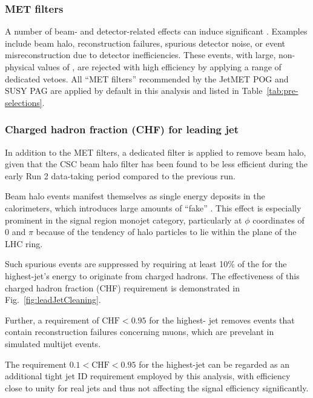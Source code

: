 \subsubsection{MET filters}

A number of beam- and detector-related effects can induce significant
\met. Examples include beam halo, reconstruction failures, spurious
detector noise, or event misreconstruction due to detector
inefficiencies. These events, with large, non-physical values of \met,
are rejected with high efficiency by applying a range of dedicated
vetoes. All ``MET filters'' recommended by the JetMET POG and SUSY PAG
are applied by default in this analysis and listed in
Table~\ref{tab:pre-selections}.

\subsubsection{Charged hadron fraction (CHF) for leading jet}

In addition to the MET filters, a dedicated filter is applied to
remove beam halo, given that the CSC beam halo filter has been found
to be less efficient during the early Run 2 data-taking period
compared to the previous run.

Beam halo events manifest themselves as single energy deposits in the
calorimeters, which introduces large amounts of ``fake'' \met. This
effect is especially prominent in the signal region monojet category,
particularly at $\phi$ coordinates of 0 and $\pi$ because of the
tendency of halo particles to lie within the plane of the LHC ring.

Such spurious events are suppressed by requiring at least 10\% of the
for the highest-\Pt jet's energy to originate from charged
hadrons. The effectiveness of this charged hadron fraction (CHF)
requirement is demonstrated in Fig.~\ref{fig:leadJetCleaning}.

Further, a requirement of $\mathrm{CHF} < 0.95$ for the highest-\Pt
jet removes events that contain reconstruction failures concerning
muons, which are prevelant in simulated multijet events.


The requirement $0.1 < \mathrm{CHF} < 0.95$ for the highest-\Pt jet
can be regarded as an additional tight jet ID requirement employed by
this analysis, with efficiency close to unity for real jets and thus
not affecting the signal efficiency significantly.

